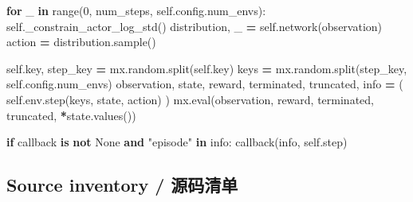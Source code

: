 \documentclass[
  chinese,
  11pt,
  letterpaper,
]{article}
\newenvironment{Shaded}{\begin{snugshade}}{\end{snugshade}}
\newcommand{\BuiltInTok}[1]{#1}
\newcommand{\ControlFlowTok}[1]{\textcolor[rgb]{0.13,0.29,0.53}{\textbf{#1}}}
\newcommand{\DecValTok}[1]{\textcolor[rgb]{0.00,0.00,0.81}{#1}}
\newcommand{\KeywordTok}[1]{\textcolor[rgb]{0.13,0.29,0.53}{\textbf{#1}}}
\newcommand{\NormalTok}[1]{#1}
\newcommand{\OperatorTok}[1]{\textcolor[rgb]{0.81,0.36,0.00}{\textbf{#1}}}
\newcommand{\StringTok}[1]{\textcolor[rgb]{0.31,0.60,0.02}{#1}}
\newcommand{\VariableTok}[1]{\textcolor[rgb]{0.00,0.00,0.00}{#1}}
\renewenvironment{Shaded}{\par\smallskip}{\par\smallskip}
\begin{document}
\begin{Shaded}
\begin{Highlighting}[]
        \ControlFlowTok{for}\NormalTok{ \_ }\KeywordTok{in} \BuiltInTok{range}\NormalTok{(}\DecValTok{0}\NormalTok{, num\_steps, }\VariableTok{self}\NormalTok{.config.num\_envs):}
            \VariableTok{self}\NormalTok{.\_constrain\_actor\_log\_std()}
\NormalTok{            distribution, \_ }\OperatorTok{=} \VariableTok{self}\NormalTok{.network(observation)}
\NormalTok{            action }\OperatorTok{=}\NormalTok{ distribution.sample()}

            \VariableTok{self}\NormalTok{.key, step\_key }\OperatorTok{=}\NormalTok{ mx.random.split(}\VariableTok{self}\NormalTok{.key)}
\NormalTok{            keys }\OperatorTok{=}\NormalTok{ mx.random.split(step\_key, }\VariableTok{self}\NormalTok{.config.num\_envs)}
\NormalTok{            observation, state, reward, terminated, truncated, info }\OperatorTok{=}\NormalTok{ (}
                \VariableTok{self}\NormalTok{.env.step(keys, state, action)}
\NormalTok{            )}
\NormalTok{            mx.}\BuiltInTok{eval}\NormalTok{(observation, reward, terminated, truncated, }\OperatorTok{*}\NormalTok{state.values())}

            \ControlFlowTok{if}\NormalTok{ callback }\KeywordTok{is} \KeywordTok{not} \VariableTok{None} \KeywordTok{and} \StringTok{"episode"} \KeywordTok{in}\NormalTok{ info:}
\NormalTok{                callback(info, }\VariableTok{self}\NormalTok{.step)}
\end{Highlighting}
\end{Shaded}

\subsection{Source inventory /
源码清单}\label{source-inventory-ux6e90ux7801ux6e05ux5355}
\end{document}
